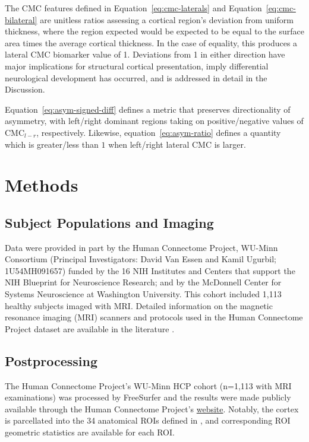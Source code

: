\documentclass{article}
\begin{document}
The CMC features defined in Equation~\ref{eq:cmc-laterals} and
Equation~\ref{eq:cmc-bilateral} are unitless ratios assessing a cortical
region's deviation from uniform thickness, where the region expected
would be expected to be equal to the surface area times the average cortical
thickness. In the case of equality, this produces a lateral CMC biomarker
value of 1. Deviations from 1 in either direction have major implications for
structural cortical presentation, imply differential neurological development
has occurred, and is addressed in detail in the Discussion.

Equation~\ref{eq:asym-signed-diff} defines a metric that preserves
directionality of asymmetry, with left/right dominant regions taking on
positive/negative values of \(\text{CMC}_{l - r}\), respectively. Likewise,
equation~\ref{eq:asym-ratio} defines a quantity which is greater/less than
\(1\) when left/right lateral \(\text{CMC}\) is larger.

\section{Methods}
\label{sec:methods}
\subsection{Subject Populations and Imaging}
\label{sec:population}

Data were provided in part by the Human Connectome Project, WU-Minn
Consortium (Principal Investigators: David Van Essen and Kamil Ugurbil;
1U54MH091657) funded by the 16 NIH Institutes and Centers that support the
NIH Blueprint for Neuroscience Research; and by the McDonnell Center for
Systems Neuroscience at Washington University. This cohort included 1,113
healthy subjects imaged with MRI\@. Detailed information on the magnetic
resonance imaging (MRI) scanners and protocols used in the Human Connectome
Project dataset are available in the literature
\citep{elamHumanConnectomeProject2021}.

\subsection{Postprocessing}
\label{sec:postprocessing}

The Human Connectome Project's WU-Minn HCP cohort (n=1,113 with MRI
examinations) was processed by FreeSurfer \citep{fischlFreeSurfer2012} and
the results were made publicly available through the Human Connectome
Project's \href{%
https://www.humanconnectome.org/study/hcp-young-adult/document/1200-subjects-data-release}{website}.
Notably, the cortex is parcellated into the 34 anatomical ROIs defined in
\citet{desikanAutomatedLabelingSystem2006}, and corresponding ROI geometric
statistics are available for each ROI.
\end{document}
